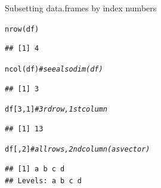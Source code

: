 \documentclass[xcolor=table,       handout,    xcolor=dvipsnames]{beamer}\usepackage[]{graphicx}\usepackage[]{color}
\makeatletter
\newcommand{\hlnum}[1]{\textcolor[rgb]{0,0,0}{#1}}
\newcommand{\hlcom}[1]{\textcolor[rgb]{0,0.392,0}{\textit{#1}}}
\newcommand{\hlstd}[1]{\textcolor[rgb]{0,0,0}{#1}}
\newcommand{\hlkwd}[1]{\textcolor[rgb]{0,0,1}{#1}}
\newenvironment{kframe}{%
 \def\at@end@of@kframe{}%
 \ifinner\ifhmode%
  \def\at@end@of@kframe{\end{minipage}}%
  \begin{minipage}{\columnwidth}%
 \fi\fi%
 \def\FrameCommand##1{\hskip\@totalleftmargin \hskip-\fboxsep
 \colorbox{shadecolor}{##1}\hskip-\fboxsep
     \hskip-\linewidth \hskip-\@totalleftmargin \hskip\columnwidth}%
 \MakeFramed {\advance\hsize-\width
   \@totalleftmargin\z@ \linewidth\hsize
   \@setminipage}}%
 {\par\unskip\endMakeFramed%
 \at@end@of@kframe}
\newenvironment{knitrout}{}{} %
\makeatother
\begin{document}

\begin{frame}[fragile]{Subsetting data.frames by index numbers}
\begin{knitrout}\small
{}\color{fgcolor}\begin{kframe}
\begin{alltt}
\hlkwd{nrow}\hlstd{(df)}
\end{alltt}
\begin{verbatim}
## [1] 4
\end{verbatim}
\begin{alltt}
\hlkwd{ncol}\hlstd{(df)} \hlcom{# see also dim(df)}
\end{alltt}
\begin{verbatim}
## [1] 3
\end{verbatim}
\end{kframe}
\end{knitrout}
\begin{knitrout}\small
{}\color{fgcolor}\begin{kframe}
\begin{alltt}
\hlstd{df[} \hlnum{3} \hlstd{,} \hlnum{1}\hlstd{]} \hlcom{# 3rd row, 1st column}
\end{alltt}
\begin{verbatim}
## [1] 13
\end{verbatim}
\begin{alltt}
\hlstd{df[   ,} \hlnum{2}\hlstd{]} \hlcom{# all rows, 2nd column (as vector)}
\end{alltt}
\begin{verbatim}
## [1] a b c d
## Levels: a b c d
\end{verbatim}
\end{kframe}
\end{knitrout}
\end{frame}

\end{document}
